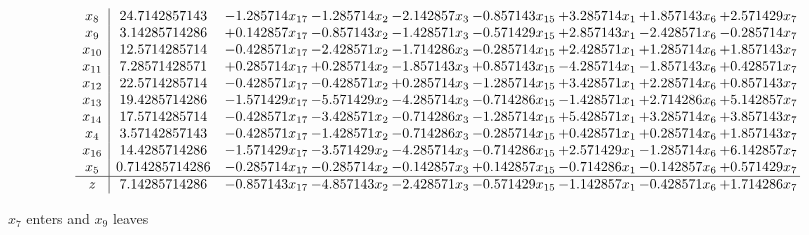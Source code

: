 \documentclass[10pt]{article}
\begin{document}
 \[\begin{array}{c| c c@{\hskip 2pt} c@{\hskip 2pt} c@{\hskip 2pt} c@{\hskip 2pt} c@{\hskip 2pt} c@{\hskip 2pt} c@{\hskip 2pt} }
 x_{8}   &  24.7142857143 & -1.285714 x_{17} & -1.285714 x_{2} & -2.142857 x_{3} & -0.857143 x_{15} & + 3.285714 x_{1} & + 1.857143 x_{6} & + 2.571429 x_{7}\\
 x_{9}   &  3.14285714286 & + 0.142857 x_{17} & -0.857143 x_{2} & -1.428571 x_{3} & -0.571429 x_{15} & + 2.857143 x_{1} & -2.428571 x_{6} & -0.285714 x_{7}\\
 x_{10}   &  12.5714285714 & -0.428571 x_{17} & -2.428571 x_{2} & -1.714286 x_{3} & -0.285714 x_{15} & + 2.428571 x_{1} & + 1.285714 x_{6} & + 1.857143 x_{7}\\
 x_{11}   &  7.28571428571 & + 0.285714 x_{17} & + 0.285714 x_{2} & -1.857143 x_{3} & + 0.857143 x_{15} & -4.285714 x_{1} & -1.857143 x_{6} & + 0.428571 x_{7}\\
 x_{12}   &  22.5714285714 & -0.428571 x_{17} & -0.428571 x_{2} & + 0.285714 x_{3} & -1.285714 x_{15} & + 3.428571 x_{1} & + 2.285714 x_{6} & + 0.857143 x_{7}\\
 x_{13}   &  19.4285714286 & -1.571429 x_{17} & -5.571429 x_{2} & -4.285714 x_{3} & -0.714286 x_{15} & -1.428571 x_{1} & + 2.714286 x_{6} & + 5.142857 x_{7}\\
 x_{14}   &  17.5714285714 & -0.428571 x_{17} & -3.428571 x_{2} & -0.714286 x_{3} & -1.285714 x_{15} & + 5.428571 x_{1} & + 3.285714 x_{6} & + 3.857143 x_{7}\\
 x_{4}   &  3.57142857143 & -0.428571 x_{17} & -1.428571 x_{2} & -0.714286 x_{3} & -0.285714 x_{15} & + 0.428571 x_{1} & + 0.285714 x_{6} & + 1.857143 x_{7}\\
 x_{16}   &  14.4285714286 & -1.571429 x_{17} & -3.571429 x_{2} & -4.285714 x_{3} & -0.714286 x_{15} & + 2.571429 x_{1} & -1.285714 x_{6} & + 6.142857 x_{7}\\
 x_{5}   &  0.714285714286 & -0.285714 x_{17} & -0.285714 x_{2} & -0.142857 x_{3} & + 0.142857 x_{15} & -0.714286 x_{1} & -0.142857 x_{6} & + 0.571429 x_{7}\\
\hline
z    &  7.14285714286 & -0.857143 x_{17} & -4.857143 x_{2} & -2.428571 x_{3} & -0.571429 x_{15} & -1.142857 x_{1} & -0.428571 x_{6} & + 1.714286 x_{7}\\
\end{array}\]


 $ x_{7} $ enters and $ x_{9} $ leaves 
\end{document}
